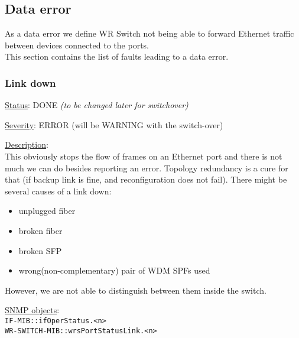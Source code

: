 \newpage
\subsection{Data error}
As a data error we define WR Switch not being able to forward Ethernet traffic
between devices connected to the ports.\\

\noindent This section contains the list of faults leading to a data error.

\subsubsection{\bf Link down}
		\label{fail:data:link_down}
		\begin{packed_enum}
			\item [] \underline{Status}: DONE  \emph{(to be changed later for switchover)}
			\item [] \underline{Severity}: ERROR (will be WARNING with the
				switch-over)
			\item [] \underline{Description}:\\
				This obviously stops the flow of frames on an Ethernet port and there is
				not much we can do besides reporting an error. Topology redundancy is a
				cure for that (if backup link is fine, and reconfiguration does not
				fail). There might be several causes of a link down:
				\begin{itemize}
					\item unplugged fiber
					\item broken fiber
					\item broken SFP
					\item wrong(non-complementary) pair of WDM SPFs used
				\end{itemize}
				However, we are not able to distinguish between them inside the switch.
			\item [] \underline{SNMP objects}:\\
				\texttt{IF-MIB::ifOperStatus.<n>}\\
				\texttt{WR-SWITCH-MIB::wrsPortStatusLink.<n>}
		\end{packed_enum}

